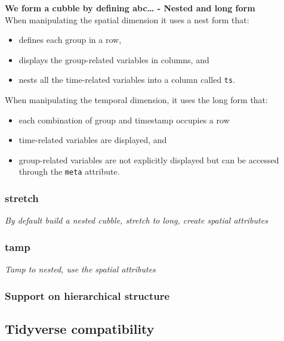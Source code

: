 \documentclass[
]{jss}
\providecommand{\tightlist}{%
  \setlength{\itemsep}{0pt}\setlength{\parskip}{0pt}}
\begin{document}
\textbf{We form a cubble by defining abc\ldots{} - Nested and long
form}\\
When manipulating the spatial dimension it uses a nest form that:

\begin{itemize}
\tightlist
\item
  defines each group in a row,
\item
  displays the group-related variables in columns, and
\item
  nests all the time-related variables into a column called \texttt{ts}.
\end{itemize}

When manipulating the temporal dimension, it uses the long form that:

\begin{itemize}
\tightlist
\item
  each combination of group and timestamp occupies a row
\item
  time-related variables are displayed, and
\item
  group-related variables are not explicitly displayed but can be
  accessed through the \texttt{meta} attribute.
\end{itemize}

\hypertarget{stretch}{%
\subsubsection{stretch}\label{stretch}}

\emph{By default build a nested cubble, stretch to long, create spatial
attributes}

\hypertarget{tamp}{%
\subsubsection{tamp}\label{tamp}}

\emph{Tamp to nested, use the spatial attributes}

\hypertarget{support-on-hierarchical-structure}{%
\subsubsection{Support on hierarchical
structure}\label{support-on-hierarchical-structure}}

\hypertarget{tidyverse-compatibility}{%
\subsection{Tidyverse compatibility}\label{tidyverse-compatibility}}
\end{document}
